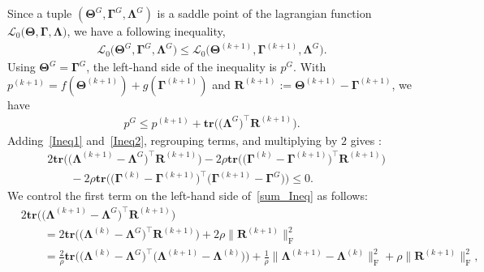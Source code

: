 \documentclass[alpha-refs]{wiley-article}
\begin{document}
Since a tuple $(\boldsymbol{\Theta}^{G}, \boldsymbol{\Gamma}^{G}, \boldsymbol{\Lambda}^{G})$ is a saddle point of the lagrangian function $\mathcal{L}_{0}\big(\boldsymbol{\Theta},\boldsymbol{\Gamma},\boldsymbol{\Lambda} \big)$, we have a following inequality,
\begin{align*}
    \mathcal{L}_{0}\big(\boldsymbol{\Theta}^{G},\boldsymbol{\Gamma}^{G},\boldsymbol{\Lambda}^{G} \big) \leq  \mathcal{L}_{0}\big(\boldsymbol{\Theta}^{(k+1)},\boldsymbol{\Gamma}^{(k+1)},\boldsymbol{\Lambda}^{G} \big).
\end{align*}
Using $\boldsymbol{\Theta}^{G} = \boldsymbol{\Gamma}^{G}$, the left-hand side of the inequality is $p^{G}$.
With $p^{(k+1)}=f(\boldsymbol{\Theta}^{(k+1)})+g(\boldsymbol{\Gamma}^{(k+1)})$ and  $\boldsymbol{R}^{(k+1)}:= \boldsymbol{\Theta}^{(k+1)}-\boldsymbol{\Gamma}^{(k+1)}$, we have
\begin{align} \label{Ineq2}
    p^{G} \leq p^{(k+1)} + \textbf{tr}\big(\big( \boldsymbol{\Lambda}^{G}\big)^{\top}\boldsymbol{R}^{(k+1)} \big).
\end{align}
Adding~\eqref{Ineq1} and~\eqref{Ineq2}, regrouping terms, and multiplying by $2$ gives :
\begin{align} \label{sum_Ineq}
    &2\textbf{tr}\big( \big( \boldsymbol{\Lambda}^{(k+1)} - \boldsymbol{\Lambda}^{G} \big)^{\top}\boldsymbol{R}^{(k+1)} \big)
    -2 \rho \textbf{tr}\big( \big( \boldsymbol{\Gamma}^{(k)} - \boldsymbol{\Gamma}^{(k+1)} \big)^{\top}\boldsymbol{R}^{(k+1)} \big) \nonumber \\
    &\qquad -2\rho \textbf{tr}\big( \big( \boldsymbol{\Gamma}^{(k)} - \boldsymbol{\Gamma}^{(k+1)} \big)^{\top}\big( 
    \boldsymbol{\Gamma}^{(k+1)}-\boldsymbol{\Gamma}^{G}\big) \big) \leq 0.
\end{align}
We control the first term on the left-hand side of~\eqref{sum_Ineq} as follows: 
\begin{align}
    &2\textbf{tr}\big( \big( \boldsymbol{\Lambda}^{(k+1)} - \boldsymbol{\Lambda}^{G} \big)^{\top}\boldsymbol{R}^{(k+1)} \big) \nonumber \\
    &\qquad= 2\textbf{tr}\big( \big( \boldsymbol{\Lambda}^{(k)} - \boldsymbol{\Lambda}^{G} \big)^{\top}\boldsymbol{R}^{(k+1)} \big)
    + 2\rho \| \boldsymbol{R}^{(k+1)} \|_{\text{F}}^{2} \nonumber \\
    &\qquad = \frac{2}{\rho}\textbf{tr}\big( \big( \boldsymbol{\Lambda}^{(k)} - \boldsymbol{\Lambda}^{G} \big)^{\top}\big( \boldsymbol{\Lambda}^{(k+1)} - \boldsymbol{\Lambda}^{(k)} \big) \big) + \frac{1}{\rho} \| \boldsymbol{\Lambda}^{(k+1)} - \boldsymbol{\Lambda}^{(k)} \|_{\text{F}}^{2} 
    + \rho \| \boldsymbol{R}^{(k+1)} \|_{\text{F}}^{2}, \label{firsterm}
\end{align}
\end{document}
